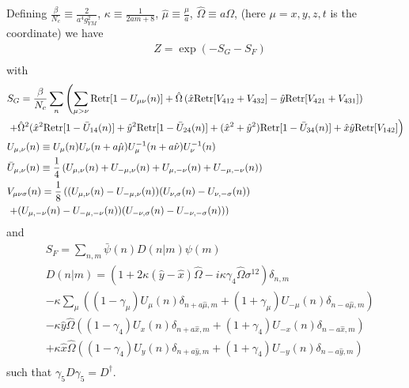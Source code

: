 Defining $\frac{\beta}{N_c} \equiv \frac{2}{a^4g_{YM}^2}$, $\kappa \equiv \frac{1}{2am+8}$, $\hat{\mu}\equiv \frac{\mu}{a}$, $\hat{\Omega}\equiv a\Omega$, (here $\mu=x,y,z,t$ is the coordinate) we have
\begin{equation}
\begin{split}
&Z=\exp (-S_G-S_F)\\
\end{split}
\end{equation}
with
\textcolor[rgb]{0,0,0.8}{
\begin{equation}
\begin{split}
&S_G=\frac{\beta}{N_c}\sum _{n}\left(\sum _{\mu >\nu}{\rm Retr}[1-U_{\mu\nu}(n)]+\hat{\Omega}\left(\hat{x}{\rm Retr}[V_{412}+V_{432}]-\hat{y}{\rm Retr}[V_{421}+V_{431}]\right)\right.\\
&\left.+\hat{\Omega}^2(\hat{x}^2{\rm Retr}[1-\bar{U}_{14}(n)]+\hat{y}^2{\rm Retr}[1-\bar{U}_{24}(n)]+(\hat{x}^2+\hat{y}^2){\rm Retr}[1-\bar{U}_{34}(n)]+\hat{x}\hat{y}{\rm Retr}[V_{142}]\right)\\
&U_{\mu, \nu}(n)\equiv U_{\mu}(n)U_{\nu}(n+a\hat{\mu})U^{-1}_{\mu}(n+a\hat{\nu})U^{-1}_{\nu}(n)\\
&\bar{U}_{\mu, \nu}(n)\equiv \frac{1}{4}\left(U_{\mu, \nu}(n)+U_{-\mu ,\nu}(n)+U_{\mu, -\nu}(n)+U_{-\mu, -\nu}(n)\right)\\
&V_{\mu\nu\sigma}(n)=\frac{1}{8}\left((U_{\mu,\nu}(n)-U_{-\mu,\nu}(n))(U_{\nu,\sigma}(n)-U_{\nu,-\sigma}(n))\right.\\
&\left.+(U_{\mu,-\nu}(n)-U_{-\mu,-\nu}(n))(U_{-\nu,\sigma}(n)-U_{-\nu,-\sigma}(n))\right)\\
\end{split}
\end{equation}
}
and
\textcolor[rgb]{0,0,0.8}{
\begin{equation}
\begin{split}
&S_F=\sum _{n,m}\bar{\psi }(n) D(n|m) \psi(m)\\
&D(n|m)=\left(1+2\kappa(\hat{y}-\hat{x})\hat{\Omega}-i\kappa \gamma _4 \hat{\Omega} \sigma ^{12}\right)\delta _{n,m}\\
&-\kappa\sum _{\mu}\left((1-\gamma _{\mu})U_{\mu}(n)\delta _{n+a\hat{\mu},m}+(1+\gamma _{\mu})U_{-\mu}(n)\delta _{n-a\hat{\mu},m}\right)\\
&-\kappa \hat{y}\hat{\Omega} \left((1-\gamma _4)U_{x}(n)\delta _{n+a\hat{x},m}+(1+\gamma _4)U_{-x}(n)\delta _{n-a\hat{x},m}\right)\\
&+\kappa \hat{x}\hat{\Omega} \left((1-\gamma _4)U_{y}(n)\delta _{n+a\hat{y},m}+(1+\gamma _4)U_{-y}(n)\delta _{n-a\hat{y},m}\right)\\
\end{split}
\end{equation}
}
such that $\gamma _5 D \gamma _5=D^{\dagger}$.


